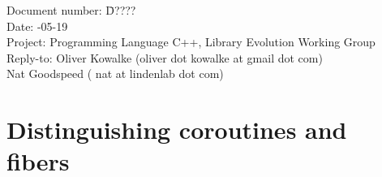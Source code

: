 \documentclass[a4paper,10pt,DIV15]{scrartcl}
\begin{document}
\small
\begin{tabbing}
    Document number: \=  D????\\
    Date:            -05-19 \\
    Project:         \> Programming Language C++, Library Evolution Working Group\\
    Reply-to:        \> Oliver Kowalke (oliver dot kowalke at gmail dot com)\\
                     \> Nat Goodspeed ( nat at lindenlab dot com)\\
\end{tabbing}

\section*{Distinguishing coroutines and fibers}


\tableofcontents












\end{document}
